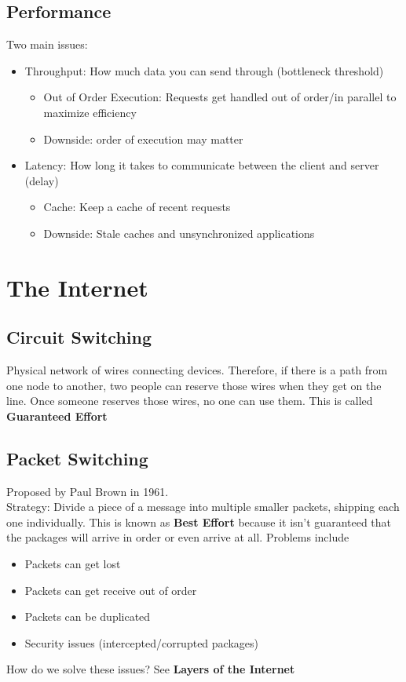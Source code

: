 \documentclass[13pt]{article}
\begin{document}
\subsection{Performance}
Two main issues:
\begin{itemize}[leftmargin = 0pt]
\item [] Throughput: How much data you can send through (bottleneck threshold)
  \begin{itemize}[leftmargin = 0pt]
  \item [] Out of Order Execution: Requests get handled out of order/in parallel to maximize efficiency
  \item [] Downside: order of execution may matter
  \end{itemize}
\item [] Latency: How long it takes to communicate between the client and server (delay)
  \begin{itemize}[leftmargin = 0pt]
  \item [] Cache: Keep a cache of recent requests
  \item [] Downside: Stale caches and unsynchronized applications
  \end{itemize}
\end{itemize}

\section{The Internet}
\subsection{Circuit Switching}
Physical network of wires connecting devices. Therefore, if there is a path from one node to another, two people can reserve those wires when they get on the line. Once someone reserves those wires, no one can use them. This is called \textbf{Guaranteed Effort}

\subsection{Packet Switching}
Proposed by Paul Brown in 1961. \\
Strategy: Divide a piece of a message into multiple smaller packets, shipping each one individually. This is known as \textbf{Best Effort} because it isn't guaranteed that the packages will arrive in order or even arrive at all. Problems include
\begin{itemize}[leftmargin = 0pt]
\item [] Packets can get lost
\item [] Packets can get receive out of order
\item [] Packets can be duplicated
\item [] Security issues (intercepted/corrupted packages)
\end{itemize}
How do we solve these issues? See \textbf{Layers of the Internet}
\end{document}
